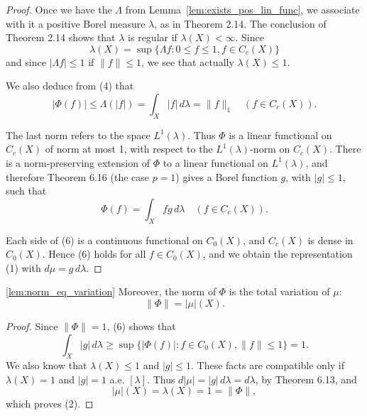 \begin{proof}
  Once we have the $\Lambda$ from Lemma~\ref{lem:exists_pos_lin_func}, we associate with it a positive Borel measure $\lambda$, as in Theorem 2.14.
  The conclusion of Theorem 2.14 shows that $\lambda$ is regular if $\lambda(X) < \infty$.
  Since
  \begin{equation}
    \lambda(X) = \sup \{\Lambda f : 0 \leq f \leq 1, f \in C_c(X)\}
  \end{equation}
  and since $|\Lambda f| \leq 1$ if $\|f\| \leq 1$, we see that actually $\lambda(X) \leq 1$.

  We also deduce from (4) that
  \begin{equation}
    |\Phi(f)| \leq \Lambda(|f|) = \int_X |f| \, d\lambda = \|f\|_1 \quad (f \in C_c(X)). \tag{5}
  \end{equation}

  The last norm refers to the space $L^1(\lambda)$.
  Thus $\Phi$ is a linear functional on $C_c(X)$ of norm at most 1, with respect to the $L^1(\lambda)$-norm on $C_c(X)$.
  There is a norm-preserving extension of $\Phi$ to a linear functional on $L^1(\lambda)$, and therefore Theorem 6.16 (the case $p = 1$) gives a Borel function $g$, with $|g| \leq 1$, such that
  \begin{equation}
    \Phi(f) = \int_X fg \, d\lambda \quad (f \in C_c(X)). \tag{6}
  \end{equation}

  Each side of (6) is a continuous functional on $C_0(X)$, and $C_c(X)$ is dense in $C_0(X)$.
  Hence (6) holds for all $f \in C_0(X)$, and we obtain the representation (1) with $d\mu = g \, d\lambda$.
\end{proof}

\begin{lemma}[Rudin 6.19]
  \ref{lem:norm_eq_variation}
  Moreover, the norm of $\Phi$ is the total variation of $\mu$:
  \begin{equation}
    \|\Phi\| = |\mu|(X). \tag{2}
  \end{equation}
\end{lemma}

\begin{proof}
  Since $\|\Phi\| = 1$, (6) shows that
  \begin{equation}
    \int_X |g| \, d\lambda \geq \sup \{|\Phi(f)| : f \in C_0(X), \|f\| \leq 1\} = 1. \tag{7}
  \end{equation}
  We also know that $\lambda(X) \leq 1$ and $|g| \leq 1$.
  These facts are compatible only if $\lambda(X) = 1$ and $|g| = 1$ a.e. $[\lambda]$.
  Thus $d|\mu| = |g| \, d\lambda = d\lambda$, by Theorem 6.13, and
  \begin{equation}
    |\mu|(X) = \lambda(X) = 1 = \|\Phi\|, \tag{8}
  \end{equation}
  which proves (2).
\end{proof}
